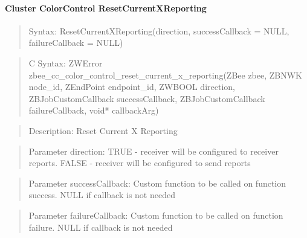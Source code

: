 \paragraph{Cluster ColorControl ResetCurrentXReporting}
\begin{quote}Syntax: ResetCurrentXReporting(direction, successCallback = NULL, failureCallback = NULL)\end{quote}
\begin{quote}C Syntax: ZWError zbee\_cc\_color\_control\_reset\_current\_x\_reporting(ZBee zbee, ZBNWK node\_id, ZEndPoint endpoint\_id, ZWBOOL direction, ZBJobCustomCallback successCallback, ZBJobCustomCallback failureCallback, void* callbackArg)\end{quote}
\begin{quote}Description: Reset Current X Reporting\end{quote}
\begin{quote}Parameter direction: TRUE  - receiver will be configured to receiver reports. FALSE - receiver will be configured to send reports\end{quote}
\begin{quote}Parameter successCallback: Custom function to be called on function success. NULL if callback is not needed\end{quote}
\begin{quote}Parameter failureCallback: Custom function to be called on function failure. NULL if callback is not needed\end{quote}


